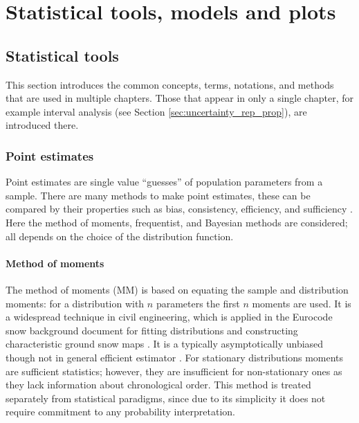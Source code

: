 
\chapter{Statistical tools, models and plots}
\label{ap:stat_tools_models}

\ifpdf
    \graphicspath{{Appendix3/Figs/Raster/}{Appendix3/Figs/PDF/}{Appendix3/Figs/}}
\else
    \graphicspath{{Appendix3/Figs/Vector/}{Appendix3/Figs/}}
\fi

\section{Statistical tools}
\label{sec:stat_tools}

This section introduces the common concepts, terms, notations, and methods that are used in multiple chapters. Those that appear in only a single chapter, for example interval analysis (see Section \ref{sec:uncertainty_rep_prop}), are introduced there.

\subsection{Point estimates}
\label{subsec:point estiamtes}

Point estimates are single value ``guesses'' of population parameters from a sample. There are many methods to make point estimates, these can be compared by their properties such as bias, consistency, efficiency, and sufficiency \citep{Tsokos2009}. Here the method of moments, frequentist, and Bayesian methods are considered; all depends on the choice of the distribution function.

\subsubsection*{Method of moments}
The method of moments (MM) is based on equating the sample and distribution moments: for a distribution with $n$ parameters the first $n$ moments are used. It is a widespread technique in civil engineering, which is applied in the Eurocode snow background document for fitting distributions and constructing characteristic ground snow maps \citep{Sanpaolesi1998}. It is a typically asymptotically unbiased though not in general efficient estimator \citep{Tsokos2009}. For stationary distributions moments are sufficient statistics; however, they are insufficient for non-stationary ones as they lack information about chronological order. This method is treated separately from statistical paradigms, since due to its simplicity it does not require commitment to any probability interpretation. 

